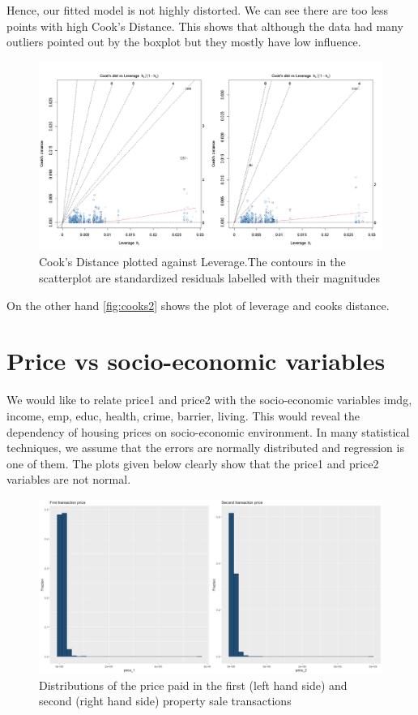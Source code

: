 \documentclass[12pt]{article}
\begin{document}
Hence, our fitted model is not highly distorted. We can see there are too less points with high Cook’s Distance. This shows that although the data had many outliers pointed out by the boxplot but they mostly have low influence.
\begin{figure}[H]
    \centering
    \includegraphics[width=18cm]{3.3 images/3.3.4.1.png}
    \caption{Cook's Distance plotted against Leverage.The contours in the scatterplot are standardized residuals labelled with their magnitudes}
    \label{fig:cooks2}
\end{figure}
On the other hand \autoref{fig:cooks2} shows the plot of leverage and cooks distance.

\section{Price vs socio-economic variables}
We would like to relate \gls{price1} and \gls{price2} with the socio-economic variables \gls{imdg}, \gls{income}, \gls{emp}, \gls{educ}, \gls{health}, \gls{crime}, \gls{barrier}, \gls{living}. This would reveal the dependency of housing prices on socio-economic environment.
In many statistical techniques, we assume that the errors are normally distributed and regression is one of them. The plots given below clearly show that the \gls{price1} and \gls{price2} variables are not normal.

\begin{figure}[H]
    \centering
    \includegraphics[width=18cm]{4. price vs socio-eco images/4non-normalplots.png}
    \caption{Distributions of the price paid in the first (left hand side) and second (right hand side) property sale transactions}
    \label{fig:prices}
\end{figure}
\end{document}
